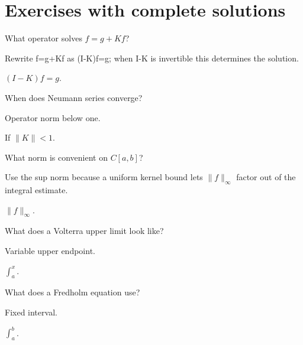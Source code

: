 \section{Exercises with complete solutions}

\begin{exercise}\label{exr:ii18-01}
What operator solves $f=g+Kf$?
\end{exercise}
\begin{hint}
Rewrite f=g+Kf as (I-K)f=g; when I-K is invertible this determines the solution.
\end{hint}
\begin{solution}
$(I-K)f=g$.
\end{solution}

\begin{exercise}\label{exr:ii18-02}
When does Neumann series converge?
\end{exercise}
\begin{hint}
Operator norm below one.
\end{hint}
\begin{solution}
If $\|K\|<1$.
\end{solution}

\begin{exercise}\label{exr:ii18-03}
What norm is convenient on $C[a,b]$?
\end{exercise}
\begin{hint}
Use the sup norm because a uniform kernel bound lets \(\lVert f\rVert_\infty\) factor out of the integral estimate.
\end{hint}
\begin{solution}
$\|f\|_\infty$.
\end{solution}

\begin{exercise}\label{exr:ii18-04}
What does a Volterra upper limit look like?
\end{exercise}
\begin{hint}
Variable upper endpoint.
\end{hint}
\begin{solution}
$\int_a^x$.
\end{solution}

\begin{exercise}\label{exr:ii18-05}
What does a Fredholm equation use?
\end{exercise}
\begin{hint}
Fixed interval.
\end{hint}
\begin{solution}
$\int_a^b$.
\end{solution}

